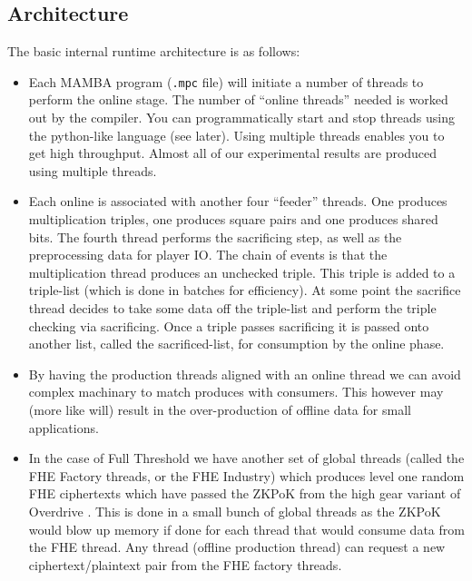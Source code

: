 \subsection{Architecture}
The basic internal runtime architecture is as follows:
\begin{itemize}
\item Each MAMBA program (\verb+.mpc+ file) will initiate a number of threads
to perform the online stage.
The number of ``online threads'' needed is worked out by the compiler. You
can programmatically start and stop threads using the python-like
language (see later).
Using multiple threads enables you to get high throughput. Almost all
of our experimental results are produced using multiple threads.
\item Each online is associated with another four ``feeder'' threads.
One produces multiplication triples, one produces square pairs
and one produces shared bits.
The fourth thread performs the sacrificing step, as well as
the preprocessing data for player IO.
The chain of events is that the multiplication thread produces
an unchecked triple. This triple is added to a triple-list (which is
done in batches for efficiency).
At some point the sacrifice thread decides to take some
data off the triple-list and perform the triple checking via
sacrificing.
Once a triple passes sacrificing it is passed onto another
list, called the sacrificed-list, for consumption by the online phase.
\item By having the production threads aligned with an online
thread we can avoid complex machinary to match produces with
consumers. This however may (more like will) result in the 
over-production of offline data for small applications.
\item In the case of Full Threshold we have another set of global
threads (called the FHE Factory threads, or the FHE Industry) 
which produces level one random FHE ciphertexts which have passed 
the ZKPoK from the high gear variant of Overdrive \cite{KPR}.
This is done in a small bunch of global threads as the ZKPoK would
blow up memory if done for each thread that would consume 
data from the FHE thread.
Any thread (offline production thread) can request a new
ciphertext/plaintext pair from the FHE factory threads.
\end{itemize}


